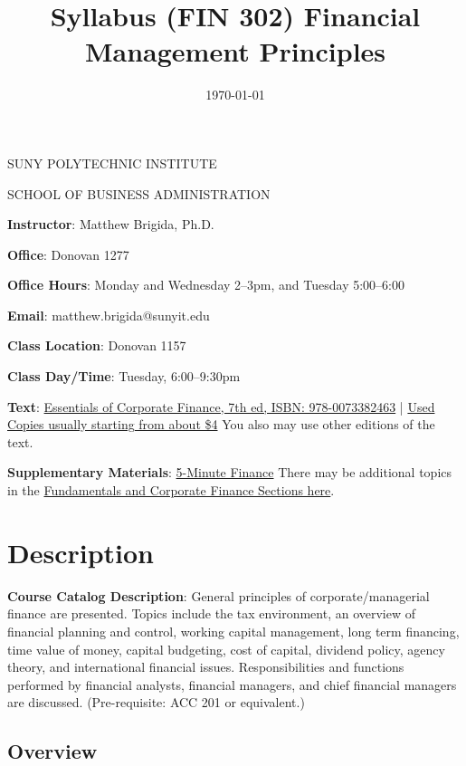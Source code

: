 \documentclass[11pt]{article}
\date{\today}
\title{Syllabus (FIN 302) Financial Management Principles}
\begin{document}
\maketitle
\begin{center}
SUNY POLYTECHNIC INSTITUTE

SCHOOL OF BUSINESS ADMINISTRATION
\end{center}


\textbf{\textbf{Instructor}}: Matthew Brigida, Ph.D.

\textbf{\textbf{Office}}: Donovan 1277

\textbf{\textbf{Office Hours}}: Monday and Wednesday 2--3pm, and Tuesday 5:00--6:00

\textbf{\textbf{Email}}:  matthew.brigida@sunyit.edu

\textbf{\textbf{Class Location}}:  Donovan 1157

\textbf{\textbf{Class Day/Time}}: Tuesday, 6:00--9:30pm

\textbf{\textbf{Text}}: \href{https://www.amazon.com/dp/0073382469/ref=olp\_product\_details?\_encoding=UTF8\&me=}{Essentials of Corporate Finance, 7th ed, ISBN: 978-0073382463} | \href{https://www.amazon.com/gp/offer-listing/0073382469/ref=dp\_olp\_used?ie=UTF8\&condition=used}{Used Copies usually starting from about \$4} You also may use other editions of the text.

\textbf{\textbf{Supplementary Materials}}: \href{https://www.5minutefinance.org/}{5-Minute Finance} There may be additional topics in the \href{https://github.com/FinancialMarkets/5MinuteFinance}{Fundamentals and Corporate Finance Sections here}.


\section{Description}
\label{sec:org0faf15a}

\textbf{\textbf{Course Catalog Description}}: General principles of corporate/managerial finance are presented. Topics include the tax environment, an overview of financial planning and control, working capital management, long term financing, time value of money, capital budgeting, cost of capital, dividend policy, agency theory, and international financial issues. Responsibilities and functions performed by financial analysts, financial managers, and chief financial managers are discussed. (Pre-requisite: ACC 201 or equivalent.)

\subsection{Overview}
\label{sec:orgb6a5fb4}
\end{document}
